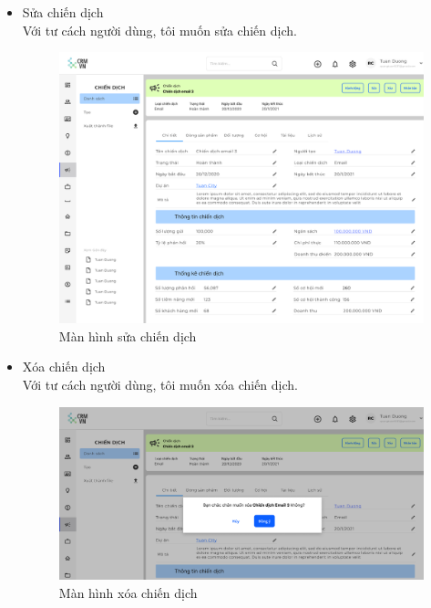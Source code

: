 \documentclass[12pt,a4paper]{article}
\begin{document}
\begin{enumerate}
\begin{itemize}
            \item Sửa chiến dịch \\
            Với tư cách người dùng, tôi muốn sửa chiến dịch.

            \begin{figure}[H]
                \centering \includegraphics[width=\textwidth]{Img/Nguyet/Chiendich/chitietcd.png}
                \vspace{0.5cm}
                \caption{Màn hình sửa chiến dịch }
                \label{suachiendich}
            \end{figure}

            \item Xóa chiến dịch \\
            Với tư cách người dùng, tôi muốn xóa chiến dịch.

            \begin{figure}[H]
                \centering \includegraphics[width=\textwidth]{Img/Nguyet/Chiendich/xoacd.png}
                \vspace{0.5cm}
                \caption{Màn hình xóa chiến dịch }
                \label{xoachiendich}
            \end{figure}


\end{itemize}
\end{enumerate}
\end{document}
